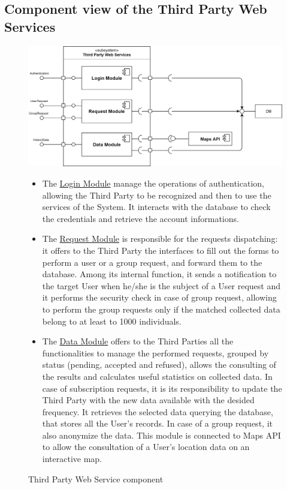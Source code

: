 \subsection{Component view of the Third Party Web Services}
\begin{figure}[H]
    \centering
    \includegraphics[scale=0.2]{./Pictures/thirdPartyServicesDiagram.png}
    \caption{Third Party Web Service component}
    
\begin{itemize}
\item  The \underline{Login Module} manage the operations of authentication, allowing the Third Party to be recognized and then to use the services of the System. It interacts with the database to check the credentials and retrieve the account informations.

\item The \underline{Request Module} is responsible for the requests dispatching: it offers to the Third Party the interfaces to fill out the forms to perform a user or a group request, and forward them to the database. Among its internal function, it sends a notification to the target User when he/she is the subject of a User request and it performs the security check in case of group request, allowing to perform the group requests only if the matched collected data belong to at least to 1000 individuals.
    
\item The \underline{Data Module} offers to the Third Parties all the functionalities to manage the performed requests, grouped by status (pending, accepted and refused), allows the consulting of the results and calculates useful statistics on collected data. In case of subscription requests, it is its responsibility to update the Third Party with the new data available with the desided frequency. It retrieves the selected data querying the database, that stores all the User's records. In case of a group request, it also anonymize the data. This module is connected to Maps API to allow the consultation of a User's location data on an interactive map.
    
\end{itemize} 
   
    
\end{figure}
